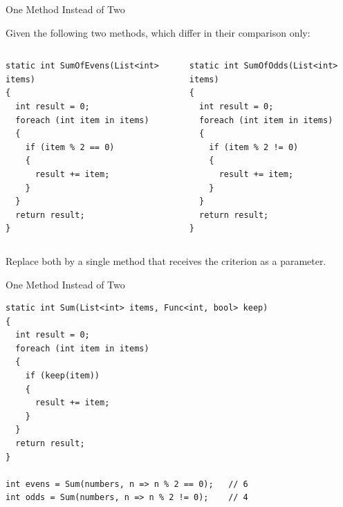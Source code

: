 \begin{exerciseframe}{One Method Instead of Two}

  Given the following two methods, which differ in their comparison only:
  \vspace{0.5ex}

  \begin{columns}[T]
      \begin{lstlisting}[basicstyle=\scriptsize\ttfamily]
static int SumOfEvens(List<int> items)
{
  int result = 0;
  foreach (int item in items)
  {
    if (item % 2 == 0)
    {
      result += item;
    }
  }
  return result;
}
      \end{lstlisting}
      \begin{lstlisting}[basicstyle=\scriptsize\ttfamily]
static int SumOfOdds(List<int> items)
{
  int result = 0;
  foreach (int item in items)
  {
    if (item % 2 != 0)
    {
      result += item;
    }
  }
  return result;
}
      \end{lstlisting}
  \end{columns}

  Replace both by a single method that receives the criterion as a parameter.

\end{exerciseframe}

\begin{solutionframe}{One Method Instead of Two}
  \begin{lstlisting}[basicstyle=\scriptsize\ttfamily]
static int Sum(List<int> items, Func<int, bool> keep)
{
  int result = 0;
  foreach (int item in items)
  {
    if (keep(item))
    {
      result += item;
    }
  }
  return result;
}

int evens = Sum(numbers, n => n % 2 == 0);   // 6
int odds = Sum(numbers, n => n % 2 != 0);    // 4
  \end{lstlisting}
  \vspace{2ex}

\end{solutionframe}

